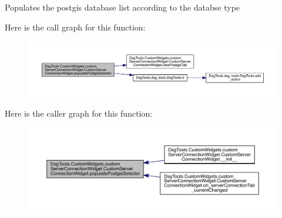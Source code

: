 \begin{DoxyVerb}Populates the postgis database list according to the databse type
\end{DoxyVerb}
 Here is the call graph for this function\+:
\nopagebreak
\begin{figure}[H]
\begin{center}
\leavevmode
\includegraphics[width=350pt]{class_dsg_tools_1_1_custom_widgets_1_1custom_server_connection_widget_1_1_custom_server_connection_widget_a341f5f3c8f937125ec2afffa8e465f9b_cgraph}
\end{center}
\end{figure}
Here is the caller graph for this function\+:
\nopagebreak
\begin{figure}[H]
\begin{center}
\leavevmode
\includegraphics[width=350pt]{class_dsg_tools_1_1_custom_widgets_1_1custom_server_connection_widget_1_1_custom_server_connection_widget_a341f5f3c8f937125ec2afffa8e465f9b_icgraph}
\end{center}
\end{figure}
\mbox{\label{class_dsg_tools_1_1_custom_widgets_1_1custom_server_connection_widget_1_1_custom_server_connection_widget_a71cabf4c45973462d4b640dae4feb911}} 
